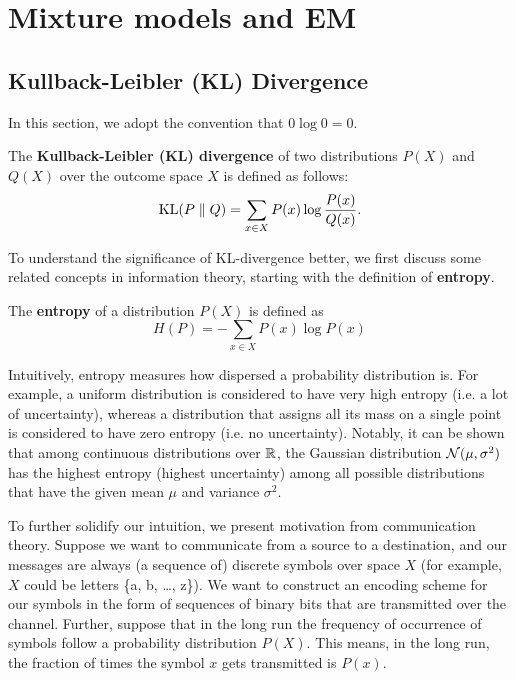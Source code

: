 \documentclass[a4paper]{article}
\begin{document}
\section{Mixture models and EM}

\subsection{Kullback-Leibler (KL) Divergence}
In this section, we adopt the convention that $0 \log 0 = 0$.

\begin{defi}[KL divergence]
  The \textbf{Kullback-Leibler (KL) divergence} of two
  distributions $P(X)$ and $Q(X)$
  over the outcome space $X$ is defined as follows:
  \[
  \operatorname{KL} (P \; \Vert \; Q) = \sum_{x \in X} P(x) \log \frac{P(x)}{Q(x)}.
  \]
\end{defi}

To understand the significance of KL-divergence better,
we first discuss some related concepts in information theory,
starting with the definition of \textbf{entropy}.
\begin{defi}
  The \textbf{entropy} of a distribution $P(X)$
  is defined as
  \[
  H(P) = - \sum_{x \in X} P(x) \log P(x)
  \]
\end{defi}

Intuitively, entropy measures how dispersed a probability
distribution is. For example, a uniform distribution is
considered to have very high entropy (i.e. a lot of uncertainty),
whereas a distribution that assigns all its mass on a single
point is considered to have zero entropy (i.e. no uncertainty).
Notably, it can be shown that among continuous distributions
over $\mathbb{R}$, the Gaussian distribution $\mathcal{N}(\mu, \sigma^2)$ has
the highest entropy (highest uncertainty) among all possible
distributions that have the given mean $\mu$ and variance $\sigma^2$.

To further solidify our intuition, we present motivation from
communication theory. Suppose we want to communicate from a
source to a destination, and our messages are always
(a sequence of) discrete symbols over space $X$
(for example, $X$ could be letters \{a, b, \dots, z\}).
We want to construct an encoding scheme for our symbols
in the form of sequences of binary bits that are transmitted
over the channel. Further, suppose that in the long run the
frequency of occurrence of symbols follow a probability
distribution $P(X)$. This means, in the long run, the fraction
of times the symbol $x$ gets transmitted is $P(x)$.
\end{document}
